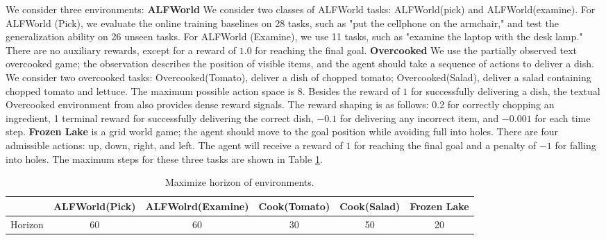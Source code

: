 We consider three environments:
\newline\textbf{ALFWorld} %
 We consider two classes of ALFWorld tasks: ALFWorld(pick) and ALFWorld(examine). For ALFWorld (Pick), we evaluate the online training baselines on 28 tasks, such as "put the cellphone on the armchair," and test the generalization ability on 26 unseen tasks. For ALFWorld (Examine), we use 11 tasks, such as "examine the laptop with the desk lamp." There are no auxiliary rewards, except for a reward of $1.0$ for reaching the final goal. 
\newline\textbf{Overcooked} We use the partially observed text overcooked game; the observation describes the position of visible items, and the agent should take a sequence of actions to deliver a dish. We consider two overcooked tasks: Overcooked(Tomato), deliver a dish of chopped tomato; Overcooked(Salad), deliver a salad containing chopped tomato and lettuce. The maximum possible action space is $8$. Besides the reward of $1$ for successfully delivering a dish, the textual Overcooked environment from \cite{tantrue} also provides dense reward signals. The reward shaping is as follows: 0.2 for correctly chopping an ingredient, 1 terminal reward for successfully delivering the correct dish, $-0.1$ for delivering any incorrect item, and $-0.001$ for each time step.
\newline\textbf{Frozen Lake} is a grid world game; the agent should move to the goal position while avoiding full into holes. There are four admissible actions: up, down, right, and left. The agent will receive a reward of $1$ for reaching the final goal and a penalty of $-1$ for falling into holes. The maximum steps for these three tasks are shown in Table \ref{tab:horizon}.
\begin{table}[]
    \centering
    \begin{tabular}{c|ccccc}
    \hline
         & ALFWorld(Pick) &ALFWolrd(Examine) &Cook(Tomato)&Cook(Salad) &Frozen Lake  \\
         \hline
         Horizon& 60&60&30&50&20 \\
         \hline
    \end{tabular}
    \caption{Maximize horizon of environments. }
    \label{tab:horizon}
\end{table}

